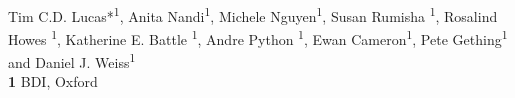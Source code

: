 \documentclass[10pt,a4]{article}
\begin{document}
\vspace*{0.2in}

\begin{flushleft}
{\Large
\textbf{} %
}
\newline
\\
Tim C.D. Lucas*\textsuperscript{1}, Anita Nandi\textsuperscript{1}, Michele Nguyen\textsuperscript{1}, Susan Rumisha \textsuperscript{1}, Rosalind Howes \textsuperscript{1}, Katherine E. Battle \textsuperscript{1}, Andre Python \textsuperscript{1}, Ewan Cameron\textsuperscript{1}, Pete Gething\textsuperscript{1} and Daniel J. Weiss\textsuperscript{1}
\\
\bigskip
\textbf{1} BDI, Oxford
\\
\bigskip

\end{flushleft}



% 
%


\clearpage
\end{document}

